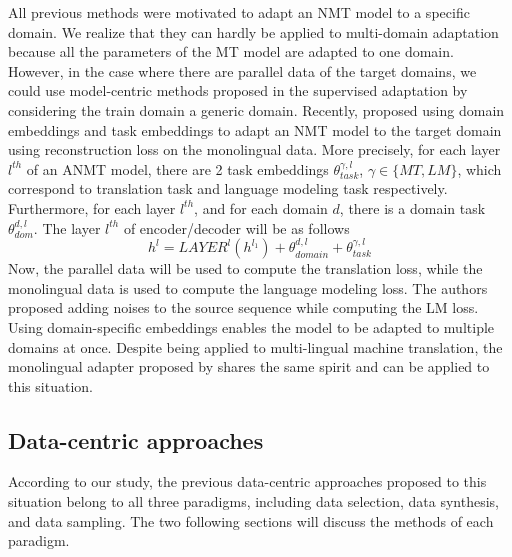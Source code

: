 All previous methods were motivated to adapt an NMT model to a specific domain. We realize that they can hardly be applied to multi-domain adaptation because all the parameters of the MT model are adapted to one domain. However, in the case where there are parallel data of the target domains, we could use model-centric methods proposed in the supervised adaptation by considering the train domain a generic domain. Recently, \citet{Dou19unsupervised} proposed using domain embeddings and task embeddings to adapt an NMT model to the target domain using reconstruction loss on the monolingual data. More precisely, for each layer $l^{th}$ of an ANMT model, there are 2 task embeddings $\theta_{task}^{\gamma,l}$, $\gamma \in \{ MT, LM \}$, which correspond to translation task and language modeling task respectively. Furthermore, for each layer $l^{th}$, and for each domain $d$, there is a domain task $\theta^{d,l}_{dom}$. The layer $l^{th}$ of encoder/decoder will be as follows
\begin{equation}
h^{l} = LAYER^l(h^{l_1}) + \theta^{d,l}_{domain} + \theta_{task}^{\gamma,l}
\end{equation}
Now, the parallel data will be used to compute the translation loss, while the monolingual data is used to compute the language modeling loss. The authors proposed adding noises to the source sequence while computing the LM loss. Using domain-specific embeddings enables the model to be adapted to multiple domains at once. Despite being applied to multi-lingual machine translation, the monolingual adapter proposed by \citet{Philip20monolingual} shares the same spirit and can be applied to this situation.
\subsection{Data-centric approaches}
\label{ssec:case-2-data}
According to our study, the previous data-centric approaches proposed to this situation belong to all three paradigms, including data selection, data synthesis, and data sampling. The two following sections will discuss the methods of each paradigm.
